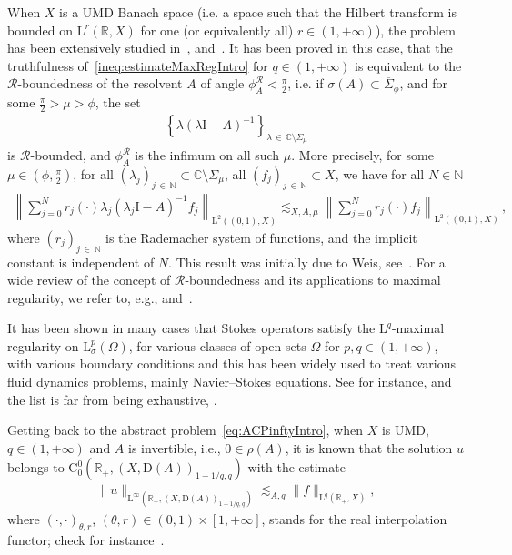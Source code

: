 \documentclass[10pt]{amsart}
\theoremstyle{definition}\newtheorem{defi}[theo]{Definition}\newtheorem{rema}[theo]{Remark}\newtheorem{exam}[theo]{Example}\newtheorem{exem}[theo]{Example}\newtheorem{nota}[theo]{Notation}
\newcommand{\bbR}{\mathbb{R}}
\newcommand{\bbC}{\mathbb{C}}
\newcommand{\bbN}{\mathbb{N}}
\newcommand{\rmD}{\mathrm{D}}
\newcommand{\rmL}{\mathrm{L}}
\newcommand{\rmC}{\mathrm{C}}
\newcommand{\rmI}{\mathrm{I}}
\newcommand{\clR}{\mathcal{R}}
\begin{document}
When $X$ is a UMD Banach space (i.e. a space such that the Hilbert transform is bounded on $\rmL^r(\bbR,X)$ for one (or equivalently all) $r\in(1,+\infty)$), the problem has been extensively studied in~\cite[Chapter~III,~Section~4]{AmmanBookParabolicVolI1995}, \cite{bookDenkHieberPruss2003} and~\cite{KunstmannWeis2004}. It has been proved in this case, that the truthfulness of~\eqref{ineq:estimateMaxRegIntro} for $q\in(1,+\infty)$ is equivalent to the $\clR$-boundedness of the resolvent $A$ of angle $\phi_{{A}}^{\clR}<\frac{\pi}{2}$, i.e. if $\sigma(A)\subset \overline{\Sigma}_{\phi}$, and for some $\frac{\pi}{2}>\mu>\phi$, the set
\begin{align*}
\left\{\lambda(\lambda \rmI -A)^{-1}\right\}_{\lambda\,\in \,\bbC\setminus {\Sigma}_{\mu}}
\end{align*}
is $\clR$-bounded, and $\phi_{{A}}^{\clR}$ is the infimum on all such $\mu$. More precisely, for some $\mu\in(\phi,\frac{\pi}{2})$, for all $(\lambda_j)_{j\,\in\,\bbN} \subset\bbC\setminus {\Sigma}_{\mu}$, all $(f_j)_{j\,\in\,\bbN} \subset X$, we have for all $N\in\bbN$
\begin{align*}
\left\| \sum_{j=0}^{N} r_j(\cdot) \lambda_{j}\left(\lambda_j\rmI -A\right)^{-1}f_j\right\|_{\rmL^2((0,1),X)} \lesssim_{X,A,\mu} \left\| \sum_{j=0}^{N} r_j(\cdot)f_j\right\|_{\rmL^2((0,1),X)}\,,
\end{align*}
where $(r_j)_{j\,\in\,\bbN}$ is the Rademacher system of functions, and the implicit constant is independent of $N$. This result was initially due to Weis, see~\cite[Theorem~4.2]{Weis2001}. For a wide review of the concept of $\clR$-boundedness and its applications to maximal regularity, we refer to, e.g., \cite{bookDenkHieberPruss2003,KunstmannWeis2004} and~\cite{DenkKrainer2007}.

It has been shown in many cases that Stokes operators satisfy the $\rmL^q$-maximal regularity on $\rmL^p_{\sigma}(\Omega)$, for various classes of open sets $\Omega$ for $p,q\in(1,+\infty)$, with various boundary conditions and this has been widely used to treat various fluid dynamics problems, mainly Navier--Stokes equations. See for instance, and the list is far from being exhaustive, \cite{GigaSohr1991,HieberMonniaux2013,
HieberNesensohnPrussSchade2016,
Hieber2020,MitreaMonniaux2009-1,
Monniaux2013,Monniaux2021,Tolksdorf2018-1,
TolksdorfWatanabe}.

Getting back to the abstract problem~\eqref{eq:ACPinftyIntro}, when $X$ is UMD, $q\in(1,+\infty)$ and $A$ is invertible, i.e., $0\in\rho(A)$, it is known that the solution $u$ belongs to $\rmC ^0_0(\bbR_+,(X,\rmD(A))_{1-1/q,q})$ with the estimate
\begin{align}\label{eq:estimatecontinuousMaxRegIntro}
\| u \|_{\rmL^{\infty}\left(\bbR_+,(X,\rmD(A))_{1-1/q,q}\right)} \lesssim_{A,q} \| f\|_{\rmL^q\left(\bbR_+,X\right)},
\end{align}
where $(\cdot,\cdot)_{\theta,r}$, $(\theta,r)\in(0,1)\times [1,+\infty]$, stands for the real interpolation functor; check for instance~\cite[Chapter~III,~Theorem~4.10.2]{AmmanBookParabolicVolI1995}.
\end{document}
